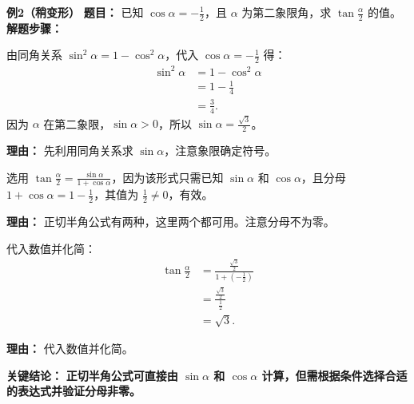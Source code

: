 \begin{examplebox}
	\medskip
	\textbf{\textcolor{CExample}{例2（稍变形）}}
	\textbf{\textcolor{CExample}{题目：}}
	已知 $\cos\alpha = -\frac{1}{2}$，且 $\alpha$ 为第二象限角，求 $\tan\frac{\alpha}{2}$ 的值。
	\textbf{\textcolor{CExample}{解题步骤：}}
	\begin{description}[style=nextline, leftmargin=2.8em, labelsep=0.5em, itemsep=0.45em]
		\item[\textbf{第一步（确定 $\sin\alpha$）：}]
			由同角关系 $\sin^2\alpha = 1-\cos^2\alpha$，代入 $\cos\alpha=-\frac{1}{2}$ 得：
			\[
				\begin{aligned}
					\sin^2\alpha &= 1 - \cos^2\alpha \\ &= 1 - \frac{1}{4} \\ &= \frac{3}{4}.
			\end{aligned}
			\]
			因为 $\alpha$ 在第二象限，$\sin\alpha>0$，所以 $\sin\alpha = \frac{\sqrt{3}}{2}$。
			\par\textbf{理由：} 先利用同角关系求 $\sin\alpha$，注意象限确定符号。
		\item[\textbf{第二步（选正切半角公式）：}]
			选用 $\tan\frac{\alpha}{2} = \frac{\sin\alpha}{1+\cos\alpha}$，因为该形式只需已知 $\sin\alpha$ 和 $\cos\alpha$，且分母 $1+\cos\alpha = 1-\frac{1}{2}$，其值为 $\frac{1}{2}\neq 0$，有效。
			\par\textbf{理由：} 正切半角公式有两种，这里两个都可用。注意分母不为零。
		\item[\textbf{第三步（代入计算）：}]
			代入数值并化简：
			\[
				\begin{aligned}
					\tan\frac{\alpha}{2} &= \frac{\frac{\sqrt{3}}{2}}{1+(-\frac{1}{2})} \\ &= \frac{\frac{\sqrt{3}}{2}}{\frac{1}{2}} \\ &= \sqrt{3}.
			\end{aligned}
			\]
			\par\textbf{理由：} 代入数值并化简。
	\end{description}
	\textbf{\textcolor{CExample}{关键结论：}}
	\textbf{正切半角公式可直接由 $\sin\alpha$ 和 $\cos\alpha$ 计算，但需根据条件选择合适的表达式并验证分母非零。}


\end{examplebox}
